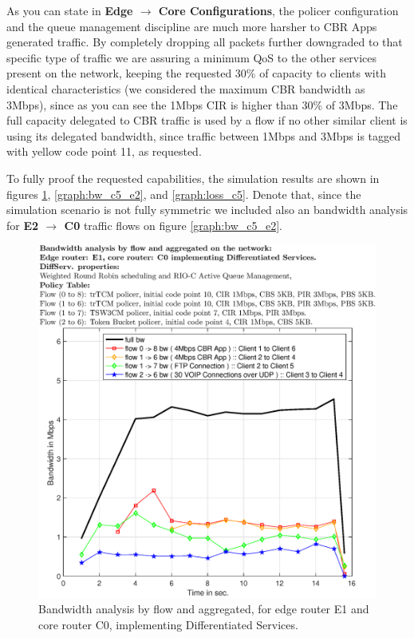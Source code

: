 \documentclass[conference,compsoc]{IEEEtran}
\begin{document}
     
     
     As you can state in \textbf{Edge $\rightarrow$ Core Configurations}, the policer configuration and the queue management discipline are much more harsher to CBR Apps generated traffic. By completely dropping all packets further downgraded to that specific type of traffic we are assuring a minimum QoS to the other services present on the network, keeping the  requested 30\% of capacity to clients with identical characteristics (we considered the maximum CBR bandwidth as 3Mbps), since as you can see the 1Mbps CIR is higher than 30\% of 3Mbps. The full capacity delegated to CBR traffic is used by a flow if no other similar client is using its delegated bandwidth, since traffic between 1Mbps and 3Mbps is tagged with yellow code point 11, as requested.\par
     To fully proof the requested capabilities, the simulation results are shown in figures \ref{graph:bw_c5_e1}, \ref{graph:bw_c5_e2}, and \ref{graph:loss_c5}. Denote that, since the simulation scenario is not fully symmetric we included also an bandwidth analysis for \textbf{E2 $\rightarrow$ C0} traffic flows on figure \ref{graph:bw_c5_e2}.

  \begin{figure}[H]
     \centering
     \includegraphics[width=1\columnwidth]{EPS/C/bw_c5_e1.eps}
     \caption{Bandwidth analysis by flow and aggregated, for edge router E1 and core router C0, implementing Differentiated Services.}
     \label{graph:bw_c5_e1}
     \end{figure}
\end{document}

